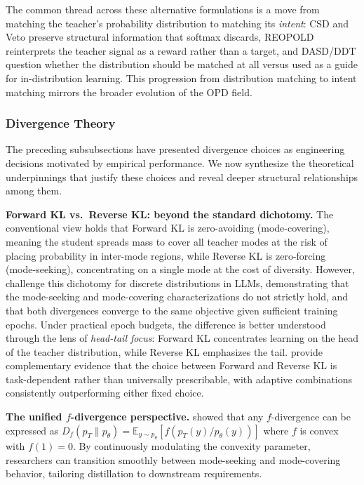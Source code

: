 \documentclass{article} %
\newcommand{\ptheta}{p_\theta}
\newcommand{\pteacher}{p_T}
\begin{document}
The common thread across these alternative formulations is a move from matching the teacher's probability distribution to matching its \emph{intent}: CSD and Veto preserve structural information that softmax discards, REOPOLD reinterprets the teacher signal as a reward rather than a target, and DASD/DDT question whether the distribution should be matched at all versus used as a guide for in-distribution learning. This progression from distribution matching to intent matching mirrors the broader evolution of the OPD field.



\subsubsection{Divergence Theory}

The preceding subsubsections have presented divergence choices as engineering decisions motivated by empirical performance. We now synthesize the theoretical underpinnings that justify these choices and reveal deeper structural relationships among them.

\textbf{Forward KL vs.\ Reverse KL: beyond the standard dichotomy.}
The conventional view holds that Forward KL is zero-avoiding (mode-covering), meaning the student spreads mass to cover all teacher modes at the risk of placing probability in inter-mode regions, while Reverse KL is zero-forcing (mode-seeking), concentrating on a single mode at the cost of diversity. However, \citet{2404.02657} challenge this dichotomy for discrete distributions in LLMs, demonstrating that the mode-seeking and mode-covering characterizations do not strictly hold, and that both divergences converge to the same objective given sufficient training epochs. Under practical epoch budgets, the difference is better understood through the lens of \emph{head-tail focus}: Forward KL concentrates learning on the head of the teacher distribution, while Reverse KL emphasizes the tail. \citet{2402.11890} provide complementary evidence that the choice between Forward and Reverse KL is task-dependent rather than universally prescribable, with adaptive combinations consistently outperforming either fixed choice.

\textbf{The unified $f$-divergence perspective.}
\citet{2307.15190} showed that any $f$-divergence can be expressed as $D_f(\pteacher \parallel \ptheta) = \mathbb{E}_{y \sim \ptheta}[f(\pteacher(y)/\ptheta(y))]$ where $f$ is convex with $f(1)=0$. By continuously modulating the convexity parameter, researchers can transition smoothly between mode-seeking and mode-covering behavior, tailoring distillation to downstream requirements.
\end{document}
